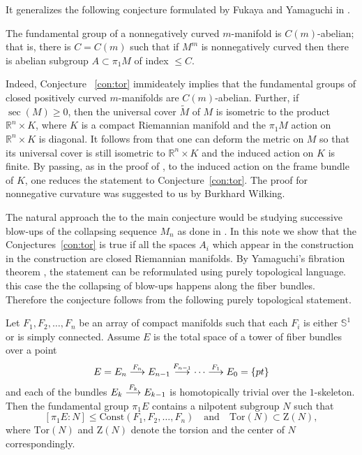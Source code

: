 \documentclass{amsart}
\begin{document}
It generalizes the following conjecture formulated by Fukaya and Yamaguchi in \cite{FY} .

\begin{conj}\label{con:c-ab}
The fundamental group of a nonnegatively curved  $m$-manifold is $C(m)$-abelian;
that is, there is $C=C(m)$ such that if $M^m$ is nonnegatively curved then there is abelian subgroup $A\subset \pi_1M$ of index $\le C$.
\end{conj}

Indeed, Conjecture ~\ref{con:tor} immideately implies that the fundamental
groups of closed positively curved $m$-manifolds are $C(m)$-abelian.
Further, if $\sec(M)\ge0$, then the universal cover $\tilde M$ of $M$ is isometric to the product $\mathbb{R}^n\times K$, where $K$ is a compact Riemannian manifold and the $\pi_1M$ action  on $\mathbb{R}^n\times K$ is diagonal.
It follows from \cite[Cor. 6.3]{wilking} that one can deform the metric on $M$ so that its universal cover is still isometric to $\mathbb{R}^n\times K$ and the induced action on $K$ is finite.
By passing, as in the proof of \cite[Corollary 4.6.1]{KPT}, to the induced action on the frame bundle of $K$, one reduces the statement to Conjecture~\ref{con:tor}.
The proof for nonnegative curvature was suggested to us by Burkhard Wilking.

The natural approach the to the main conjecture would be studying successive blow-ups of the
collapsing sequence $M_n$ as done in \cite[Section 4.3]{KPT}.
In this note we show that the Conjectures~\ref{con:tor} is true if all the spaces $A_i$ which appear in the construction in the construction are closed Riemannian manifolds.
By Yamaguchi's fibration theorem \cite{Yam}, the statement can be reformulated using purely topological language. this case the the collapsing of blow-ups happens along the fiber bundles.
Therefore the conjecture follows from the following purely topological statement.

\begin{thm}\label{thm:smooth}
Let $F_1,F_2,\dots,F_n$ be an array of compact manifolds 
such that each $F_i$ is either $\mathbb{S}^{1}$ or is simply connected. 
Assume $E$ is the total space of a tower of fiber bundles over a point
$$E=E_n\buildrel {F_n}\over \longrightarrow E_{n-1}\buildrel {F_{n-1}}\over\longrightarrow\dots\buildrel {F_1}\over\longrightarrow E_0=\{pt\}$$
and each of the bundles $E_k\buildrel {F_k}\over \longrightarrow E_{k-1}$ is homotopically trivial over the $1$-skeleton. 
Then the fundamental group $\pi_1E$ contains a nilpotent subgroup $N$ such that
$$[\pi_1E:N]\le \mathrm{Const}(F_1,F_2,\dots,F_n)\quad\text{and}\quad\mathrm{Tor}(N)\subset \mathrm{Z}(N),$$
where $\mathrm{Tor}(N)$ and $\mathrm{Z}(N)$ denote the torsion and the center of $N$ correspondingly.
\end{thm}
\end{document}
